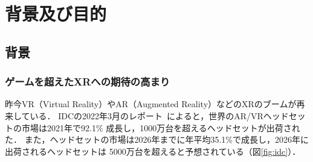 \section{背景及び目的}

\subsection{背景}

\subsubsection{ゲームを超えたXRへの期待の高まり}

昨今VR（Virtual Reality）やAR（Augmented Reality）などのXRのブームが再来している．
IDCの2022年3月のレポート~\cite{idc}によると，世界のAR/VRヘッドセットの市場は2021年で92.1\%
成長し，1000万台を超えるヘッドセットが出荷された．
また，ヘッドセットの市場は2026年までに年平均35.1\%で成長し，2026年に出荷されるヘッドセットは
5000万台を超えると予想されている（図\ref{fig:idc}）．

